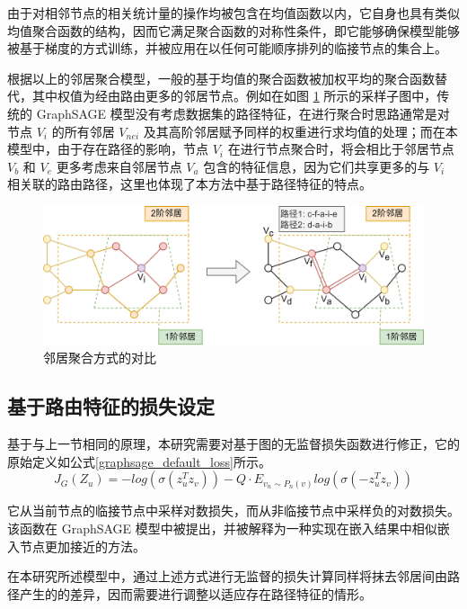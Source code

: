 由于对相邻节点的相关统计量的操作均被包含在均值函数以内，它自身也具有类似均值聚合函数的结构，因而它满足聚合函数的对称性条件，即它能够确保模型能够被基于梯度的方式训练，并被应用在以任何可能顺序排列的临接节点的集合上。

根据以上的邻居聚合模型，一般的基于均值的聚合函数被加权平均的聚合函数替代，其中权值为经由路由更多的邻居节点。例如在如图 \ref{c4_nei-agg} 所示的采样子图中，传统的 GraphSAGE 模型没有考虑数据集的路径特征，在进行聚合时思路通常是对节点 $V_i$ 的所有邻居 $V_{nei}$ 及其高阶邻居赋予同样的权重进行求均值的处理；而在本模型中，由于存在路径的影响，节点 $V_i$ 在进行节点聚合时，将会相比于邻居节点 $V_b$ 和 $V_e$ 更多考虑来自邻居节点 $V_a$ 包含的特征信息，因为它们共享更多的与 $V_i$ 相关联的路由路径，这里也体现了本方法中基于路径特征的特点。

\begin{figure}[h]
    \includegraphics[width=0.9\linewidth]{chapter/c4_images/c4_nei-agg.png}
    \caption{邻居聚合方式的对比}
    \label{c4_nei-agg}
\end{figure}

\subsection{基于路由特征的损失设定}

基于与上一节相同的原理，本研究需要对基于图的无监督损失函数进行修正，它的原始定义如公式\ref{graphsage_default_loss}所示。
\begin{equation} \label{graphsage_default_loss}
J_G(Z_u) = -log(\sigma(z_u^{T}z_v)) - Q \cdot E_{v_n \sim P_n(v)}log(\sigma(-z_u^{T}z_v))
\end{equation}

它从当前节点的临接节点中采样对数损失，而从非临接节点中采样负的对数损失。该函数在 GraphSAGE 模型中被提出，并被解释为一种实现在嵌入结果中相似嵌入节点更加接近的方法。

在本研究所述模型中，通过上述方式进行无监督的损失计算同样将抹去邻居间由路径产生的的差异，因而需要进行调整以适应存在路径特征的情形。

